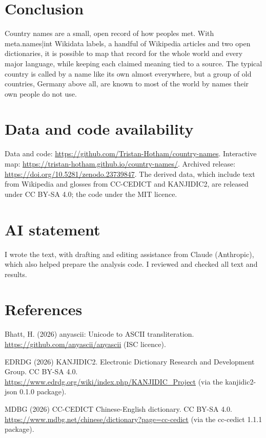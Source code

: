 \documentclass[11pt,a4paper]{article}
\begin{document}
\section{Conclusion}

Country names are a small, open record of how peoples met. With {{meta.names|int}} Wikidata labels, a handful of Wikipedia articles and two open dictionaries, it is possible to map that record for the whole world and every major language, while keeping each claimed meaning tied to a source. The typical country is called by a name like its own almost everywhere, but a group of old countries, Germany above all, are known to most of the world by names their own people do not use.

\section*{Data and code availability}

Data and code: \url{https://github.com/Tristan-Hotham/country-names}. Interactive map: \url{https://tristan-hotham.github.io/country-names/}. Archived release: \url{https://doi.org/10.5281/zenodo.23739847}. The derived data, which include text from Wikipedia and glosses from CC-CEDICT and KANJIDIC2, are released under CC BY-SA 4.0; the code under the MIT licence.

\section*{AI statement}

I wrote the text, with drafting and editing assistance from Claude (Anthropic), which also helped prepare the analysis code. I reviewed and checked all text and results.

\section*{References}
\small
Bhatt, H. (2026) anyascii: Unicode to ASCII transliteration. \url{https://github.com/anyascii/anyascii} (ISC licence).

EDRDG (2026) KANJIDIC2. Electronic Dictionary Research and Development Group. CC BY-SA 4.0. \url{https://www.edrdg.org/wiki/index.php/KANJIDIC_Project} (via the kanjidic2-json 0.1.0 package).

MDBG (2026) CC-CEDICT Chinese-English dictionary. CC BY-SA 4.0. \url{https://www.mdbg.net/chinese/dictionary?page=cc-cedict} (via the cc-cedict 1.1.1 package).
\end{document}
